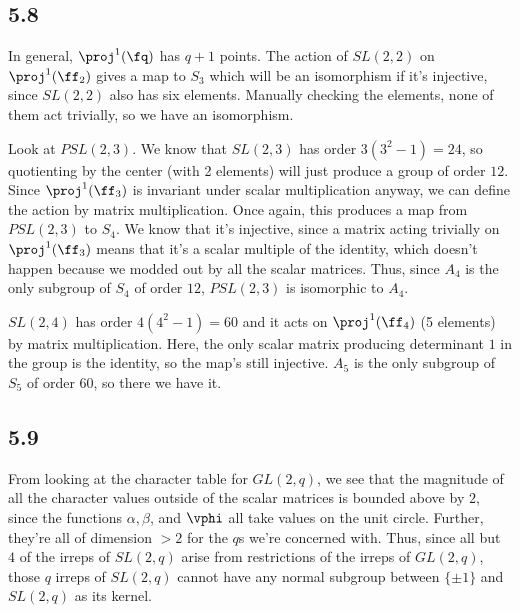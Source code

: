 \documentclass{article}
\begin{document}
%
%         
\subsection*{5.8}
In general, $\proj^1(\fq)$ has $q+1$ points. The action of $SL(2,2)$ on $\proj^1(\ff_2)$ gives a map to $S_3$ which will be an isomorphism if it's injective, since $SL(2,2)$ also has six elements. Manually checking the elements, none of them act trivially, so we have an isomorphism.

Look at $PSL(2,3)$. We know that $SL(2,3)$ has order $3(3^2-1)=24$, so quotienting by the center (with 2 elements) will just produce a group of order $12$. Since $\proj^1(\ff_3)$ is invariant under scalar multiplication anyway, we can define the action by matrix multiplication. Once again, this produces a map from $PSL(2,3)$ to $S_4$. We know that it's injective, since a matrix acting trivially on $\proj^1(\ff_3)$ means that it's a scalar multiple of the identity, which doesn't happen because we modded out by all the scalar matrices. Thus, since $A_4$ is the only subgroup of $S_4$ of order $12$, $PSL(2,3)$ is isomorphic to $A_4$.

$SL(2,4)$ has order $4(4^2-1)=60$ and it acts on $\proj^1(\ff_4)$ (5 elements) by matrix multiplication. Here, the only scalar matrix producing determinant $1$ in the group is the identity, so the map's still injective. $A_5$ is the only subgroup of $S_5$ of order $60$, so there we have it.
\subsection*{5.9}
From looking at the character table for $GL(2,q)$, we see that the magnitude of all the character values outside of the scalar matrices is bounded above by $2$, since the functions $\alpha,\beta$, and $\vphi$ all take values on the unit circle. Further, they're all of dimension $>2$ for the $q$s we're concerned with. Thus, since all but $4$ of the irreps of $SL(2,q)$ arise from restrictions of the irreps of $GL(2,q)$, those $q$ irreps of $SL(2,q)$ cannot have any normal subgroup between $\{\pm1\}$ and $SL(2,q)$ as its kernel.
\end{document}

